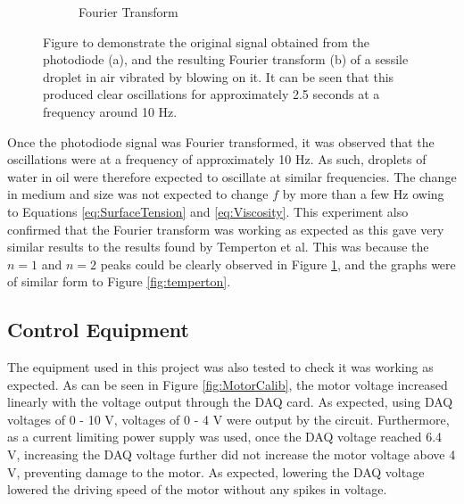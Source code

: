 \documentclass{physics_article_B}
\begin{document}
\begin{figure}[H]
\begin{subfigure}[b]{0.48\textwidth}
                    \caption{Fourier Transform}
                    \label{fig:Water:FT}
                \end{subfigure}
            \caption{Figure to demonstrate the original signal obtained from the photodiode (a), and the resulting Fourier transform (b) of a sessile droplet in air vibrated by blowing on it. It can be seen that this produced clear oscillations for approximately 2.5 seconds at a frequency around 10 Hz. }\label{fig:Water}
            \end{figure} 
            
    Once the photodiode signal was Fourier transformed, it was observed that the oscillations were at a frequency of approximately 10 Hz. As such, droplets of water in oil were therefore expected to oscillate at similar frequencies. The change in medium and size was not expected to change $f$ by more than a few Hz owing to Equations \ref{eq:SurfaceTension} and \ref{eq:Viscosity}. This experiment also confirmed that the Fourier transform was working as expected as this gave very similar results to the results found by Temperton et al\cite{temperton}. This was because the $n = 1$ and $n = 2$ peaks could be clearly observed in Figure \ref{fig:Water:FT}, and the graphs were of similar form to Figure \ref{fig:temperton}.

    \subsection{Control Equipment\label{sect:results:control}}
    
        The equipment used in this project was also tested to check it was working as expected. As can be seen in Figure \ref{fig:MotorCalib}, the motor voltage increased linearly with the voltage output through the DAQ card. As expected, using DAQ voltages of 0 - 10 V, voltages of 0 - 4 V were output by the circuit. Furthermore, as a current limiting power supply was used, once the DAQ voltage reached 6.4 V, increasing the DAQ voltage further did not increase the motor voltage above 4 V, preventing damage to the motor. As expected, lowering the DAQ voltage lowered the driving speed of the motor without any spikes in voltage.
        
\end{document}
